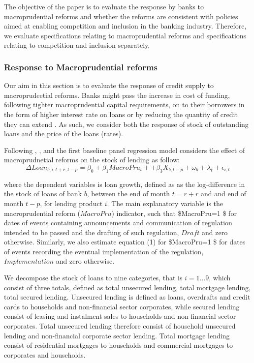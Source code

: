 \documentclass[
  letterpaper,
  DIV=11,
  numbers=noendperiod]{scrartcl}
\begin{document}
The objective of the paper is to evaluate the response by banks to
macroprudential reforms and whether the reforms are consistent with
policies aimed at enabling competition and inclusion in the banking
industry. Therefore, we evaluate specifications relating to
macroprudential reforms and specifications relating to competition and
inclusion separately,

\hypertarget{response-to-macroprudential-reforms}{%
\subsubsection{Response to Macroprudential
reforms}\label{response-to-macroprudential-reforms}}

Our aim in this section is to evaluate the response of credit supply to
macroprudeetial reforms. Banks might pass the increase in cost of
funding, following tighter macroprudential capital requirements, on to
their borrowers in the form of higher interest rate on loans or by
reducing the quantity of credit they can extend
\citep{noss2016estimating}. As such, we consider both the response of
stock of outstanding loans and the price of the loans (rates).

Following \cite{aiyar2016does}, \cite{deli2017real}, \cite{fang2022bank}
and \cite{mirzaei2022effectiveness} the first baseline panel regression
model considers the effect of macroprudnetial reforms on the stock of
lending as follow: \begin{equation}
    \Delta Loan_{b,i,t+r,t-p}=\beta_{0}+ \beta_{1}MacroPru_{t}++\beta_{3}X_{b,t-p}+ \omega_{b}+ \lambda_{t}+\epsilon_{i,t}
\end{equation}

where the dependent variables is loan growth, defined as as the
log-difference in the stock of loans of bank \(b\), between the end of
month \(t=r+r\) and and end of month \(t-p\), for lending product \(i\).
The main explanatory variable is the macroprudential reform
(\(MacroPru\)) indicator, such that \$MacroPru=1 \$ for dates of events
containing announcements and communication of regulation intended to be
passed and the drafting of such regulation, \(Draft\) and zero
otherwise. Similarly, we also estimate equation (1) for \$MacroPru=1 \$
for dates of events recording the eventual implementation of the
regulation, \(Implementation\) and zero otherwise.

We decompose the stock of loans to nine categories, that is \(i=1...9\),
which consist of three totals, defined as total unsecured lending, total
mortgage lending, total secured lending. Unsecured lending is defined as
loans, overdrafts and credit cards to households and non-financial
sector corporates, while secured lending consist of leasing and
instalment sales to households and non-financial sector corporates.
Total unsecured lending therefore consist of household unsecured lending
and non-financial corporate sector lending. Total mortgage lending
consist of residential mortgages to households and commercial mortgages
to corporates and households.
\end{document}
